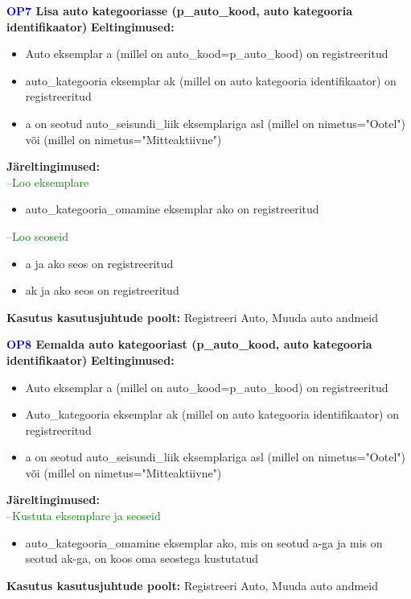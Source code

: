 \textbf{\textcolor{blue}{OP7} Lisa auto kategooriasse (p\_auto\_kood, auto kategooria identifikaator)}
\textbf{Eeltingimused:}
\begin{itemize}
	\item Auto eksemplar a (millel on auto\_kood=p\_auto\_kood) on registreeritud
	\item auto\_kategooria eksemplar ak (millel on auto kategooria identifikaator) on registreeritud
	\item a on seotud auto\_seisundi\_liik eksemplariga asl (millel on nimetus="Ootel") või (millel on nimetus="Mitteaktiivne")
\end{itemize}
\textbf{Järeltingimused:} \\
\textcolor{green}{--Loo eksemplare}
\begin{itemize}
	\item auto\_kategooria\_omamine eksemplar ako on registreeritud
\end{itemize}
\textcolor{green}{--Loo seoseid}
\begin{itemize}
	\item a ja ako seos on registreeritud
	\item ak ja ako seos on registreeritud
\end{itemize}
\textbf{Kasutus kasutusjuhtude poolt:} Registreeri Auto, Muuda auto andmeid \\ \hfill

\textbf{\textcolor{blue}{OP8} Eemalda auto kategooriast (p\_auto\_kood, auto kategooria identifikaator)}
\textbf{Eeltingimused:}
\begin{itemize}
	\item Auto eksemplar a (millel on auto\_kood=p\_auto\_kood) on registreeritud 
	\item Auto\_kategooria eksemplar ak (millel on auto kategooria identifikaator) on registreeritud
	\item a on seotud auto\_seisundi\_liik eksemplariga asl (millel on nimetus="Ootel") või (millel on nimetus="Mitteaktiivne")
\end{itemize}
\textbf{Järeltingimused:} \\
\textcolor{green}{--Kustuta eksemplare ja seoseid}
\begin{itemize}
	\item auto\_kategooria\_omamine eksemplar ako, mis on seotud a-ga ja mis on seotud ak-ga, on koos oma seostega kustutatud
\end{itemize}
\textbf{Kasutus kasutusjuhtude poolt:} Registreeri Auto, Muuda auto andmeid \\ \hfill

